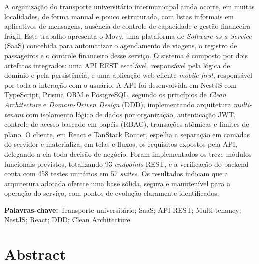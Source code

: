 \documentclass[12pt,openright,oneside,a4paper]{article}
\begin{document}
A organização do transporte universitário intermunicipal ainda ocorre, em muitas localidades, de forma manual e pouco estruturada, com listas informais em aplicativos de mensagens, ausência de controle de capacidade e gestão financeira frágil. Este trabalho apresenta o Movy, uma plataforma de \textit{Software as a Service} (SaaS) concebida para automatizar o agendamento de viagens, o registro de passageiros e o controle financeiro desse serviço. O sistema é composto por dois artefatos integrados: uma API REST escalável, responsável pela lógica de domínio e pela persistência, e uma aplicação web cliente \textit{mobile-first}, responsável por toda a interação com o usuário. A API foi desenvolvida em NestJS com TypeScript, Prisma ORM e PostgreSQL, segundo os princípios de \textit{Clean Architecture} e \textit{Domain-Driven Design} (DDD), implementando arquitetura \textit{multi-tenant} com isolamento lógico de dados por organização, autenticação JWT, controle de acesso baseado em papéis (RBAC), transações atômicas e limites de plano. O cliente, em React e TanStack Router, espelha a separação em camadas do servidor e materializa, em telas e fluxos, os requisitos expostos pela API, delegando a ela toda decisão de negócio. Foram implementados os treze módulos funcionais previstos, totalizando 93 \textit{endpoints} REST, e a verificação do backend conta com 458 testes unitários em 57 \textit{suites}. Os resultados indicam que a arquitetura adotada oferece uma base sólida, segura e manutenível para a operação do serviço, com pontos de evolução claramente identificados.

\textbf{Palavras-chave:} Transporte universitário; SaaS; API REST; Multi-tenancy; NestJS; React; DDD; Clean Architecture.

\newpage
\section*{Abstract}
\end{document}
